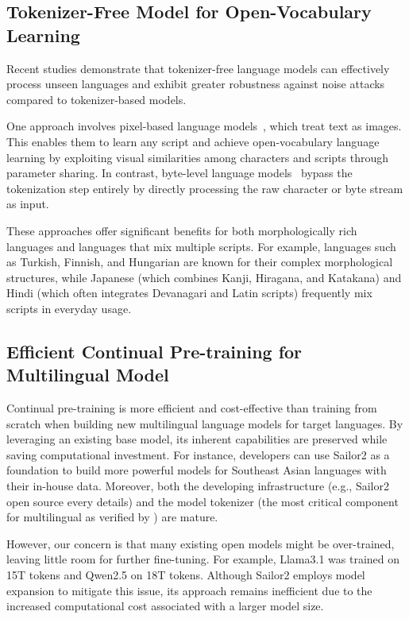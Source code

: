 \subsection{Tokenizer-Free Model for Open-Vocabulary Learning}
\label{sec:future_work_tokenizer_free_model}

Recent studies demonstrate that tokenizer-free language models can effectively process unseen languages and exhibit greater robustness against noise attacks compared to tokenizer-based models. 

One approach involves pixel-based language models~\citep{lotz-etal-2023-text, rust-etal-2023-pixel}, which treat text as images. This enables them to learn any script and achieve open-vocabulary language learning by exploiting visual similarities among characters and scripts through parameter sharing. In contrast, byte-level language models~\citep{evabyte, kallini2024mrt5, xue-etal-2022-byt5} bypass the tokenization step entirely by directly processing the raw character or byte stream as input.

These approaches offer significant benefits for both morphologically rich languages and languages that mix multiple scripts. 
For example, languages such as Turkish, Finnish, and Hungarian are known for their complex morphological structures, while Japanese (which combines Kanji, Hiragana, and Katakana) and Hindi (which often integrates Devanagari and Latin scripts) frequently mix scripts in everyday usage.

\subsection{Efficient Continual Pre-training for Multilingual Model}
\label{sec:future_work_efficient_training}

Continual pre-training is more efficient and cost-effective than training from scratch when building new multilingual language models for target languages. 
By leveraging an existing base model, its inherent capabilities are preserved while saving computational investment. 
For instance, developers can use Sailor2 as a foundation to build more powerful models for Southeast Asian languages with their in-house data. 
Moreover, both the developing infrastructure (e.g., Sailor2 open source every details) and the model tokenizer (the most critical component for multilingual as verified by \cite{tao2024scaling}) are mature.

However, our concern is that many existing open models might be over-trained, leaving little room for further fine-tuning. 
For example, Llama3.1 was trained on 15T tokens and Qwen2.5 on 18T tokens. Although Sailor2 employs model expansion to mitigate this issue, its approach remains inefficient due to the increased computational cost associated with a larger model size.

